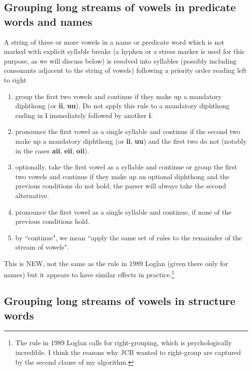 \documentclass[12pt]{book}
\begin{document}
\subsection{Grouping long streams of vowels in predicate words and names}

A string of three or more vowels  in a name or predicate word which is not marked with explicit syllable breaks (a hyphen or a stress marker is used for this purpose, as we will discuss below) is resolved into syllables (possibly including consonants adjacent to the string of vowels)  following a priority order reading left to right  

\begin{enumerate}

\item group the first two vowels and continue if they make up a mandatory diphthong (or {\bf ii}, {\bf uu}).  Do not apply this rule to a mandatory diphthong ending in {\bf i} immediately followed by another {\bf i}.

\item pronounce the first vowel as a single syllable and continue if the second two make up a mandatory diphthong (or {\bf ii}, {\bf uu})  and the first two do not (notably in the cases {\bf aii}, {\bf eii}, {\bf oii}).

\item optionally, take the first vowel as a syllable and continue or group the first two vowels and continue if they make up an optional diphthong and the previous conditions do
 not hold; the parser will always take the second alternative.

\item  pronounce the first vowel as a single syllable and continue, if none of the previous conditions hold.

\item  by ``continue", we mean ``apply the same set of rules to the remainder of the stream of vowels".

\end{enumerate}

This is NEW, not the same as the rule in 1989 Loglan (given there only for names) but it appears to have similar effects in practice.\footnote{The rule in 1989 Loglan calls for right-grouping, which is psychologically incredible.  I think the reasons why JCB wanted to right-group are captured by the second clause of my algorithm.}

\subsection{Grouping long streams of vowels in structure words}
\end{document}
